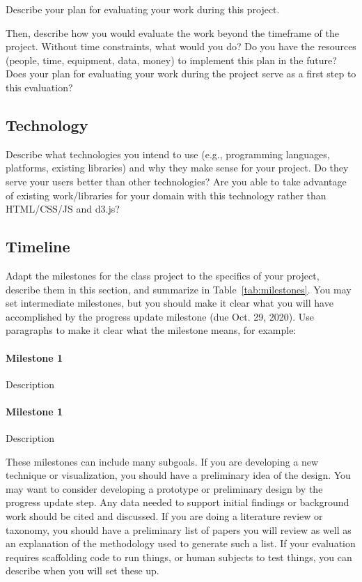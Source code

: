Describe your plan for evaluating your work during this project.

Then, describe how you would evaluate the work beyond the timeframe of the project. Without time constraints, what would you do? Do you have the resources (people, time, equipment, data, money) to implement this plan in the future? Does your plan for evaluating your work during the project serve as a first step to this evaluation?

\subsection{Technology}
\label{sec:tech}

Describe what technologies you intend to use (e.g., programming languages, platforms, existing libraries) and why they make sense for your project. Do they serve your users better than other technologies? Are you able to take advantage of existing work/libraries for your domain with this technology rather than HTML/CSS/JS and d3.js?  

\subsection{Timeline}
\label{sec:timeline}

Adapt the milestones for the class project to the specifics of your project, describe them in this section, and summarize in Table~\ref{tab:milestones}.  You may set intermediate milestones, but you should make it clear what you will have accomplished by the progress update milestone (due Oct. 29, 2020).  Use paragraphs to make it clear what the milestone means, for example:

\paragraph{Milestone 1} Description

\paragraph{Milestone 1} Description

These milestones can include many subgoals.  If you are developing a new technique or visualization, you should have a preliminary idea of the design.  You may want to consider developing a prototype or preliminary design by the progress update step.  Any data needed to support initial findings or background work should be cited and discussed.  If you are doing a literature review or taxonomy, you should have a preliminary list of papers you will review as well as an explanation of the methodology used to generate such a list.  If your evaluation requires scaffolding code to run things, or human subjects to test things, you can describe when you will set these up.

